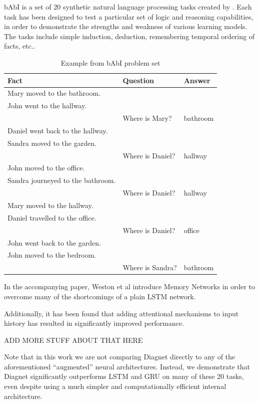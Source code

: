 \documentclass{article}
\begin{document}
bAbI is a set of 20 synthetic natural language processing tasks created by \citet{2015arXiv150205698W}. Each task has been designed to test a particular set of logic and reasoning capabilities, in order to demonstrate the strengths and weakness of various learning models. The tasks include simple induction, deduction, remembering temporal ordering of facts, etc..

\begin{table}
\caption{Example from bAbI problem set}
\centering
\begin{tabular}{|l|l|l|}
\hline
Fact & Question & Answer \\
\hline
Mary moved to the bathroom. & & \\
John went to the hallway. & & \\
 & Where is Mary? & bathroom \\
Daniel went back to the hallway. & & \\
Sandra moved to the garden. & & \\
 & Where is Daniel? & hallway \\
John moved to the office. & & \\
Sandra journeyed to the bathroom. & & \\
& Where is Daniel? & hallway \\
Mary moved to the hallway. & & \\
Daniel travelled to the office. & & \\
& Where is Daniel? & office \\
John went back to the garden. & & \\
John moved to the bedroom. & & \\
& Where is Sandra? & bathroom \\
\hline
\end{tabular}
\end{table}

In the accompanying paper, Weston et al introduce Memory Networks in order to overcome many of the shortcomings of a plain LSTM network. 

Additionally, it has been found that adding attentional mechanisms to input history has resulted in significantly improved performance.

ADD MORE STUFF ABOUT THAT HERE

Note that in this work we are not comparing Diagnet directly to any of the aforementioned “augmented” neural architectures. Instead, we demonstrate that Diagnet significantly outperforms LSTM and GRU on many of these 20 tasks, even despite using a much simpler and computationally efficient internal architecture.
\end{document}
